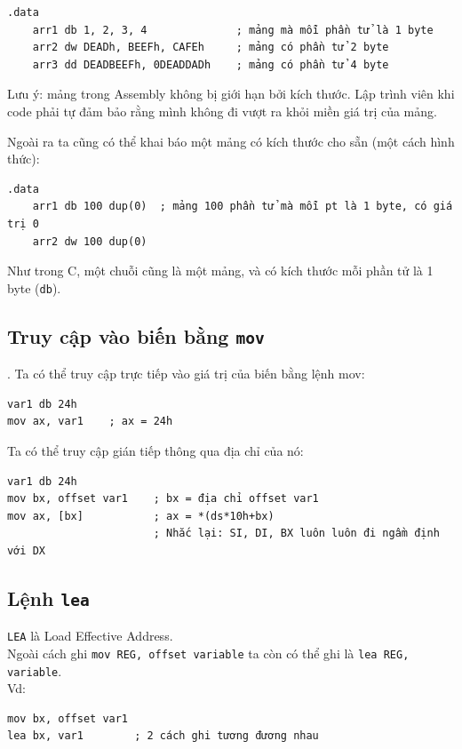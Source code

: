 \documentclass[12pt]{report}
\newcommand{\code}[1]{\texttt{#1}}
\begin{document}
\begin{verbatim}
.data
    arr1 db 1, 2, 3, 4              ; mảng mà mỗi phần tử là 1 byte
    arr2 dw DEADh, BEEFh, CAFEh     ; mảng có phần tử 2 byte
    arr3 dd DEADBEEFh, 0DEADDADh    ; mảng có phần tử 4 byte
\end{verbatim}
Lưu ý: mảng trong Assembly không bị giới hạn bởi kích thước. Lập trình viên khi code phải tự đảm bảo rằng mình không đi vượt ra khỏi miền giá trị của mảng.

Ngoài ra ta cũng có thể khai báo một mảng có kích thước cho sẵn (một cách hình thức):
\begin{verbatim}
.data
    arr1 db 100 dup(0)  ; mảng 100 phần tử mà mỗi pt là 1 byte, có giá trị 0
    arr2 dw 100 dup(0)
\end{verbatim}

Như trong C, một chuỗi cũng là một mảng, và có kích thước mỗi phần tử là 1 byte (\code{db}).

\subsection{Truy cập vào biến bằng \code{mov}}.
Ta có thể truy cập trực tiếp vào giá trị của biến bằng lệnh mov:
\begin{verbatim}
var1 db 24h
mov ax, var1    ; ax = 24h
\end{verbatim}
Ta có thể truy cập gián tiếp thông qua địa chỉ của nó:
\begin{verbatim}
var1 db 24h            
mov bx, offset var1    ; bx = địa chỉ offset var1
mov ax, [bx]           ; ax = *(ds*10h+bx) 
                       ; Nhắc lại: SI, DI, BX luôn luôn đi ngầm định với DX
\end{verbatim}

\subsection{Lệnh \code{lea}}
\code{LEA} là Load Effective Address.\\
Ngoài cách ghi \code{mov REG, offset variable} ta còn có thể ghi là \code{lea REG, variable}.\\
Vd:
\begin{verbatim}
mov bx, offset var1 
lea bx, var1        ; 2 cách ghi tương đương nhau
\end{verbatim}
\end{document}
